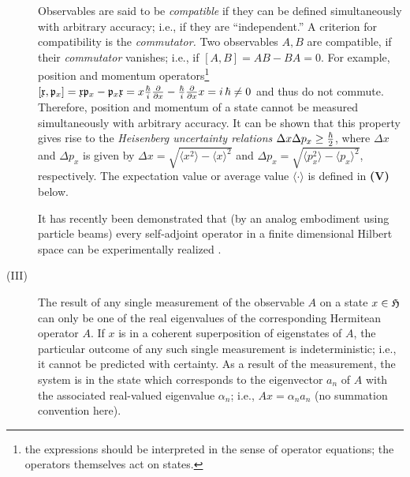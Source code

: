 \begin{description}
Observables are said to be {\em compatible} if they can be defined
simultaneously with arbitrary accuracy; i.e., if they are
``independent.'' A criterion for compatibility is the {\em commutator.}
Two observables ${A},{B}$ are compatible, if their {\em
commutator} vanishes; i.e.,
if $\left[
{A},
{B}
\right] =
{A}
{B}  -
{B}
{A}   =0$.
For example, position and momentum operators\footnote{the expressions
should be interpreted in the sense of
operator equations; the operators themselves act on states.}
$
\left[
{{\frak x}},
{{\frak p_x}}
\right] =
{{\frak x}}
{{\frak p_x}}-
{{\frak p_x}}
{{\frak x}} =
x
{\hbar \over i} {\partial \over \partial x}-
{\hbar \over i} {\partial \over \partial x}
x
=i\, \hbar
\neq 0
$
and thus do not commute. Therefore, position and momentum of a state
cannot be measured simultaneously with arbitrary accuracy.
It can be shown that this property gives rise to the {\em Heisenberg
uncertainty relations}
$
\Delta x
\Delta p_x \ge {\hbar \over 2}
$,
where
$
\Delta x
$
and
$
\Delta p_x
$
is given by
$
\Delta x =\sqrt{\langle x^2\rangle -\langle x\rangle ^2}
$
and
$
\Delta p_x =\sqrt{\langle p_x^2\rangle -\langle p_x\rangle ^2}
$,  respectively.
The expectation value
 or average value
$\langle \cdot \rangle $
is
defined in
{\bf
(V)} below.


It has recently been demonstrated that
(by an analog embodiment using
particle beams) every self-adjoint operator in a finite dimensional Hilbert
space can be experimentally realized \cite{rzbb}.

\item[(III)]
The result of any single measurement of the observable $A$
on a state $x\in {\cal H}$
can only be one of the real eigenvalues of the corresponding
Hermitean operator $A$.
If $x$ is in a coherent superposition of eigenstates of $A$, the
particular outcome of any such single measurement is indeterministic;
i.e.,
it cannot be predicted with certainty. As a
result of the measurement,
the system is in the state which corresponds to the eigenvector $a_n$ of
$A$ with the associated real-valued eigenvalue
$\alpha_n$; i.e., $Ax=\alpha_n a_n$ (no summation convention here).


\end{description}
